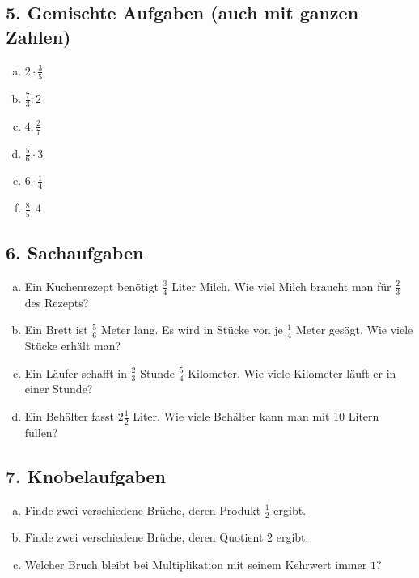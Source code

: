 \subsection*{5. Gemischte Aufgaben (auch mit ganzen Zahlen)}
\begin{enumerate}[a)]
    \item $2 \cdot \frac{3}{5}$
    \item $\frac{7}{3} : 2$
    \item $4 : \frac{2}{7}$
    \item $\frac{5}{6} \cdot 3$
    \item $6 \cdot \frac{1}{4}$
    \item $\frac{8}{5} : 4$
\end{enumerate}

\subsection*{6. Sachaufgaben}
\begin{enumerate}[a)]
    \item Ein Kuchenrezept benötigt $\frac{3}{4}$ Liter Milch. Wie viel Milch braucht man für $\frac{2}{3}$ des Rezepts?
    \item Ein Brett ist $\frac{5}{6}$ Meter lang. Es wird in Stücke von je $\frac{1}{4}$ Meter gesägt. Wie viele Stücke erhält man?
    \item Ein Läufer schafft in $\frac{2}{3}$ Stunde $\frac{5}{4}$ Kilometer. Wie viele Kilometer läuft er in einer Stunde?
    \item Ein Behälter fasst $2\frac{1}{2}$ Liter. Wie viele Behälter kann man mit 10 Litern füllen?
\end{enumerate}

\subsection*{7. Knobelaufgaben}
\begin{enumerate}[a)]
    \item Finde zwei verschiedene Brüche, deren Produkt $\frac{1}{2}$ ergibt.
    \item Finde zwei verschiedene Brüche, deren Quotient $2$ ergibt.
    \item Welcher Bruch bleibt bei Multiplikation mit seinem Kehrwert immer $1$?
\end{enumerate}
